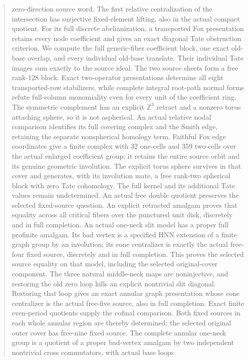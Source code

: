 \documentclass[11pt,a4paper]{article}
\begin{document}
\begin{abstract}
zero-direction source word. The first relative centralization of the
intersection has surjective fixed-element lifting, also in the actual
compact quotient. For its full discrete abelianization, a transported
Fox presentation retains every node coefficient and gives an exact
diagonal Tate obstruction criterion. We compute the full generic-fiber
coefficient block, one exact old-base overlap, and every individual
old-base translate. Their individual Tate images sum exactly to the
source ideal. The two source sheets form a free rank-128 block.
Exact two-operator presentations determine all eight transported-row
stabilizers, while complete integral root-path normal forms refute
full-column monomiality even for every unit of the coefficient ring.
The symmetric complement has an explicit $\mathbb Z^3$ retract and a
nonzero torus attaching sphere, so it is not aspherical. An actual
relative nodal comparison identifies its full covering complex and the
Smith edge, retaining the separate nonspherical homology term. Faithful
Fox edge coordinates give a finite complex with 32 one-cells and 359
two-cells over the actual enlarged coefficient group; it retains the
entire source orbit and its genuine geometric involution. The explicit
torus sphere survives in that cover and generates, with its involution
mate, a free rank-two spherical block with zero Tate cohomology. The
full kernel and its additional Tate values remain undetermined. An actual
free double quotient preserves the selected fixed-source question.
An explicit retracted amalgam proves that equality across all critical
fibers over the punctured unit disk, discretely and in full completion.
An actual one-neck slit model has a proper full profinite amalgam.
Its bad vertex is a specified HNN extension of a finite graph group by
an involution; its cone centralizer is exactly the actual free-four
fixed source, discretely and in full completion. This proves the selected
source equality on that model, including the selected original-cover
component. The three natural middle-neck maps are noninjective, and
restoring the old zero loop kills an explicit nontrivial slit diagonal.
Restoring that loop gives an exact annular graph presentation whose
cone centralizer is the actual free-five source, also in full completion.
Exact finite even-period quotients supply the cofinal comparison. Both
fixed sources in each whole annular region are thereby determined; the
selected original outer cover has free-nine fixed source. The complete
annular one-neck group is a quotient of a proper bad-vertex amalgam by
two independent nontrivial cross commutators, with actual base loops

\end{abstract}
\end{document}
